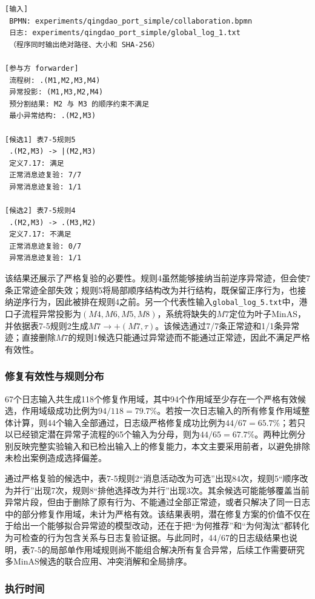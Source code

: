 \begin{lstlisting}[caption={新原型系统对顺序逆转异常的输出节选},label={lst:detect_repair_new}]
[输入]
 BPMN: experiments/qingdao_port_simple/collaboration.bpmn
 日志: experiments/qingdao_port_simple/global_log_1.txt
 （程序同时输出绝对路径、大小和 SHA-256）

[参与方 forwarder]
 流程树: .(M1,M2,M3,M4)
 异常投影: (M1,M3,M2,M4)
 预分割结果: M2 与 M3 的顺序约束不满足
 最小异常结构: .(M2,M3)

[候选1] 表7-5规则5
 .(M2,M3) -> |(M2,M3)
 定义7.17: 满足
 正常消息迹复验: 7/7
 异常消息迹复验: 1/1

[候选2] 表7-5规则4
 .(M2,M3) -> .(M3,M2)
 定义7.17: 不满足
 正常消息迹复验: 0/7
 异常消息迹复验: 1/1
\end{lstlisting}

该结果还展示了严格复验的必要性。规则4虽然能够接纳当前逆序异常迹，但会使7条正常迹全部失效；规则5将局部顺序结构改为并行结构，既保留正序行为，也接纳逆序行为，因此被排在规则4之前。另一个代表性输入\texttt{global\_log\_5.txt}中，港口子流程异常投影为$(M4,M6,M5,M8)$，系统将缺失的$M7$定位为叶子MinAS，并依据表7-5规则2生成$M7\rightarrow +(M7,\tau)$。该候选通过7/7条正常迹和1/1条异常迹；直接删除$M7$的规则1候选只能通过异常迹而不能通过正常迹，因此不满足严格有效性。

\subsubsection{修复有效性与规则分布}

67个日志输入共生成118个修复作用域，其中94个作用域至少存在一个严格有效候选，作用域级成功比例为$94/118=79.7\%$。若按一次日志输入的所有修复作用域整体计算，则44个输入全部通过，日志级严格修复成功比例为$44/67=65.7\%$；若只以已经锁定潜在异常子流程的65个输入为分母，则为$44/65=67.7\%$。两种比例分别反映完整实验输入和已检出输入上的修复能力，本文主要采用前者，以避免排除未检出案例造成选择偏差。

通过严格复验的候选中，表7-5规则2“消息活动改为可选”出现84次，规则5“顺序改为并行”出现7次，规则8“排他选择改为并行”出现3次。其余候选可能能够覆盖当前异常片段，但由于删除了原有行为、不能通过全部正常迹，或者只解决了同一日志中的部分修复作用域，未计为严格有效。该结果表明，潜在修复方案的价值不仅在于给出一个能够拟合异常迹的模型改动，还在于把“为何推荐”和“为何淘汰”都转化为可检查的行为包含关系与日志复验证据。与此同时，44/67的日志级结果也说明，表7-5的局部单作用域规则尚不能组合解决所有复合异常，后续工作需要研究多MinAS候选的联合应用、冲突消解和全局排序。

\subsubsection{执行时间}

